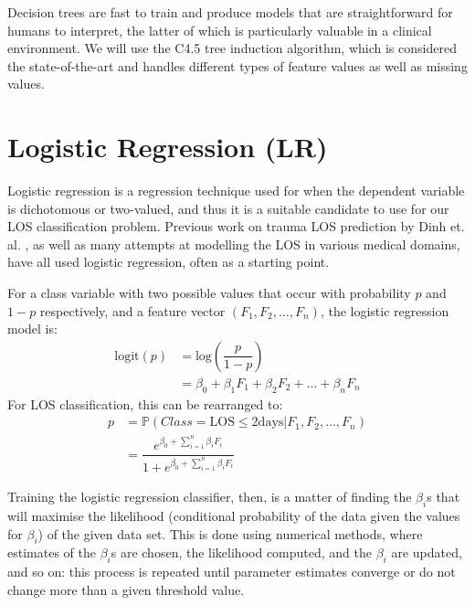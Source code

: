 Decision trees are fast to train and produce models that are straightforward
for humans to interpret, the latter of which is particularly valuable in a
clinical environment. We will use the C4.5 tree induction algorithm, which is
considered the state-of-the-art and handles different types of feature values
as well as missing values.

\section{Logistic Regression (LR)}
Logistic regression is a regression technique used for when the dependent
variable is dichotomous or two-valued, and thus it is a suitable candidate to
use for our LOS classification problem.
Previous work on trauma LOS prediction by
Dinh et. al. \cite{Dinh2013a}, as well as many attempts at modelling the LOS
in various medical domains, have all used logistic regression, often as a
starting point.

For a class variable with two possible values that occur with
probability $p$ and $1-p$ respectively, and a feature vector
$(F_1,F_2,\ldots,F_n)$, the logistic regression model is:
\begin{equation*}
\begin{aligned}
\mathrm{logit}(p) &= \mathrm{log} \left(\dfrac{p}{1-p}\right) \\
  &= \beta_0 + \beta_1F_1 + \beta_2F_2 + \ldots + \beta_nF_n
\end{aligned}
\end{equation*}
For LOS classification, this can be rearranged to:
\begin{equation*}
\begin{aligned}
p &= \mathbb{P}(Class=\mathrm{LOS }\leq2\mathrm{ days}|F_1,F_2,\ldots,F_n) \\
  &= \dfrac{e^{\beta_0 + \sum^n_{i=1}\beta_i F_i}}{1 + e^{\beta_0 + \sum^n_{i=1}\beta_i F_i}}
\end{aligned}
\end{equation*}

Training the logistic regression classifier, then, is a matter of finding the
$\beta_i$s that will maximise the likelihood (conditional probability of the
data given the values for $\beta_i$) of the given data set. This is done using
numerical methods, where estimates of the $\beta_i$s are chosen, the likelihood
computed, and the $\beta_i$ are updated, and so on: this process is repeated
until parameter estimates converge or do not change more than a given threshold
value.

